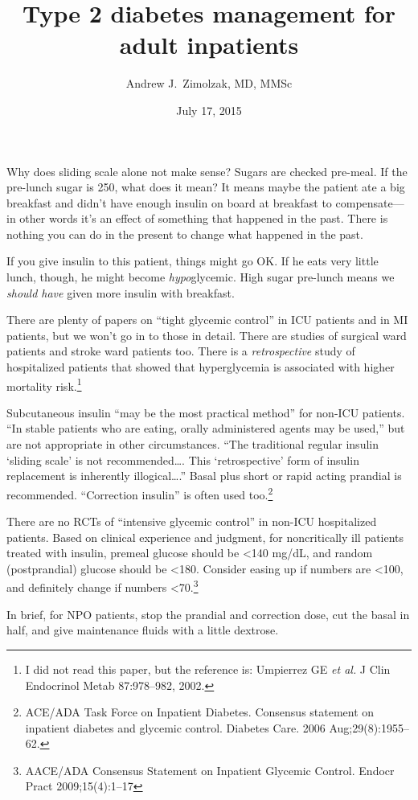 \documentclass{article}
\title{Type 2 diabetes management for adult inpatients}
\author{Andrew J.\ Zimolzak, MD, MMSc}
\date{July 17, 2015}
\begin{document}
\maketitle


Why does sliding scale alone not make sense? Sugars are checked
pre-meal. If the pre-lunch sugar is 250, what does it mean? It means
maybe the patient ate a big breakfast and didn't have enough insulin
on board at breakfast to compensate---in other words it's an effect
of something that happened in the past. There is nothing you can do in
the present to change what happened in the past.

If you give insulin to this patient, things might go OK. If he eats
very little lunch, though, he might become
\emph{hypo}glycemic. High sugar pre-lunch means we \emph{should have}
given more insulin with breakfast.

There are plenty of papers on ``tight glycemic control'' in ICU
patients and in MI patients, but we won't go in to those in
detail. There are studies of surgical ward patients and stroke ward
patients too. There is a \emph{retrospective} study of hospitalized
patients that showed that hyperglycemia is associated with higher
mortality risk.\footnote{I did not read this paper, but the reference
  is: Umpierrez GE \emph{et al.} J Clin Endocrinol Metab 87:978--982,
  2002.}

Subcutaneous insulin ``may be the most practical method'' for non-ICU
patients. ``In stable patients who are eating, orally administered
agents may be used,'' but are not appropriate in other
circumstances. ``The traditional regular insulin `sliding scale' is
not recommended\ldots{}. This `retrospective' form of insulin
replacement is inherently illogical\ldots{}.'' Basal plus short or
rapid acting prandial is recommended. ``Correction insulin'' is often
used too.\footnote{ACE/ADA Task Force on Inpatient Diabetes. Consensus
  statement on inpatient diabetes and glycemic control. Diabetes
  Care. 2006 Aug;29(8):1955--62.}

There are no RCTs of ``intensive glycemic control'' in non-ICU
hospitalized patients. Based on clinical experience and judgment, for
noncritically ill patients treated with insulin, premeal glucose
should be <140 mg/dL, and random (postprandial) glucose should be
<180. Consider easing up if numbers are <100, and definitely change if
numbers <70.\footnote{AACE/ADA Consensus Statement on Inpatient
  Glycemic Control. Endocr Pract 2009;15(4):1--17}

In brief, for NPO patients, stop the prandial and correction dose, cut
the basal in half, and give maintenance fluids with a little
dextrose.
\end{document}
